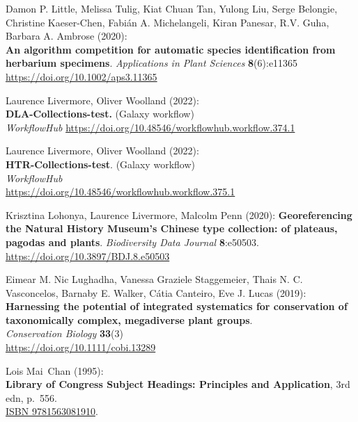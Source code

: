 \begin{thebibliography}{9}
Damon P. Little, Melissa Tulig, Kiat Chuan Tan, Yulong Liu, Serge Belongie, Christine Kaeser‐Chen, Fabián A. Michelangeli, Kiran Panesar, R.V. Guha, Barbara A. Ambrose (2020):\\
\textbf{An algorithm competition for automatic species identification from herbarium specimens}. 
\emph{Applications in Plant Sciences} \textbf{8}(6):e11365\\
\url{https://doi.org/10.1002/aps3.11365}

Laurence Livermore, Oliver Woolland (2022):\\
\textbf{DLA-Collections-test.} (Galaxy workflow)\\
\emph{WorkflowHub}
\url{https://doi.org/10.48546/workflowhub.workflow.374.1}

Laurence Livermore, Oliver Woolland (2022):\\
\textbf{HTR-Collections-test}. (Galaxy workflow)\\
\emph{WorkflowHub}\\
\url{https://doi.org/10.48546/workflowhub.workflow.375.1}

Krisztina Lohonya, Laurence Livermore, Malcolm Penn (2020):
\textbf{Georeferencing the Natural History Museum's Chinese type collection: of plateaus,
pagodas and plants}. 
\emph{Biodiversity Data Journal} \textbf{8}:e50503.\\
\url{https://doi.org/10.3897/BDJ.8.e50503}

Eimear M. Nic Lughadha, Vanessa Graziele Staggemeier, Thais N. C. Vasconcelos, Barnaby E. Walker, Cátia Canteiro, Eve J. Lucas (2019):\\
\textbf{Harnessing the potential of integrated systematics for conservation of taxonomically complex, megadiverse plant groups}.\\ 
\emph{Conservation Biology} \textbf{33}(3)\\
\url{https://doi.org/10.1111/cobi.13289}


Lois Mai~Chan (1995):\\
\textbf{Library of Congress Subject Headings: Principles and
Application}, 3rd edn, p.~556.\\
\href{https://identifiers.org/isbn/9781563081910}{ISBN 9781563081910}.


\end{thebibliography}
